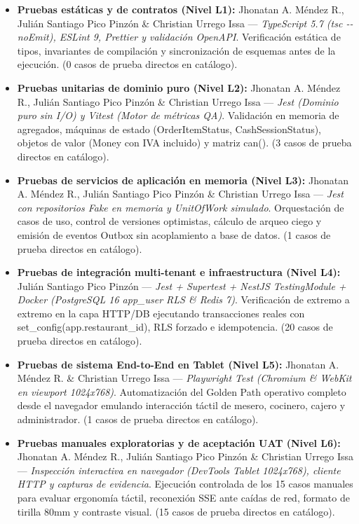 \documentclass[10pt,a4paper]{article}
\providecommand{\tightlist}{\setlength{\itemsep}{0pt}\setlength{\parskip}{0pt}}
\begin{document}
\begin{itemize}
\tightlist
\item
  \textbf{Pruebas estáticas y de contratos (Nivel L1):} Jhonatan A. Méndez R., Julián Santiago Pico Pinzón \& Christian Urrego Issa --- \emph{TypeScript 5.7 (tsc -\/-noEmit), ESLint 9, Prettier y validación OpenAPI}. Verificación estática de tipos, invariantes de compilación y sincronización de esquemas antes de la ejecución. (0 casos de prueba directos en catálogo).
\item
  \textbf{Pruebas unitarias de dominio puro (Nivel L2):} Jhonatan A. Méndez R., Julián Santiago Pico Pinzón \& Christian Urrego Issa --- \emph{Jest (Dominio puro sin I/O) y Vitest (Motor de métricas QA)}. Validación en memoria de agregados, máquinas de estado (OrderItemStatus, CashSessionStatus), objetos de valor (Money con IVA incluido) y matriz can(). (3 casos de prueba directos en catálogo).
\item
  \textbf{Pruebas de servicios de aplicación en memoria (Nivel L3):} Jhonatan A. Méndez R., Julián Santiago Pico Pinzón \& Christian Urrego Issa --- \emph{Jest con repositorios Fake en memoria y UnitOfWork simulado}. Orquestación de casos de uso, control de versiones optimistas, cálculo de arqueo ciego y emisión de eventos Outbox sin acoplamiento a base de datos. (1 casos de prueba directos en catálogo).
\item
  \textbf{Pruebas de integración multi-tenant e infraestructura (Nivel L4):} Julián Santiago Pico Pinzón --- \emph{Jest + Supertest + NestJS TestingModule + Docker (PostgreSQL 16 app\_user RLS \& Redis 7)}. Verificación de extremo a extremo en la capa HTTP/DB ejecutando transacciones reales con set\_config(\textquotesingle app.restaurant\_id\textquotesingle), RLS forzado e idempotencia. (20 casos de prueba directos en catálogo).
\item
  \textbf{Pruebas de sistema End-to-End en Tablet (Nivel L5):} Jhonatan A. Méndez R. \& Christian Urrego Issa --- \emph{Playwright Test (Chromium \& WebKit en viewport 1024x768)}. Automatización del Golden Path operativo completo desde el navegador emulando interacción táctil de mesero, cocinero, cajero y administrador. (1 casos de prueba directos en catálogo).
\item
  \textbf{Pruebas manuales exploratorias y de aceptación UAT (Nivel L6):} Jhonatan A. Méndez R., Julián Santiago Pico Pinzón \& Christian Urrego Issa --- \emph{Inspección interactiva en navegador (DevTools Tablet 1024x768), cliente HTTP y capturas de evidencia}. Ejecución controlada de los 15 casos manuales para evaluar ergonomía táctil, reconexión SSE ante caídas de red, formato de tirilla 80mm y contraste visual. (15 casos de prueba directos en catálogo).
\end{itemize}
\end{document}
